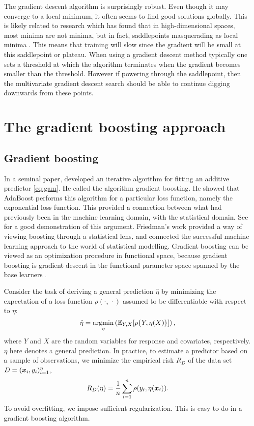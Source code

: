 The gradient descent algorithm is surprisingly robust. Even though it may converge to a local minimum, it often seems to find good solutions globally. This is likely related to research which has found that in high-dimensional spaces, most minima are not minima, but in fact, saddlepoints masquerading as local minima \citep{saddlepoints}. This means that training will slow since the gradient will be small at this saddlepoint or plateau. When using a gradient descent method typically one sets a threshold at which the algorithm terminates when the gradient becomes smaller than the threshold. However if powering through the saddlepoint, then the multivariate gradient descent search should be able to continue digging downwards from these points.

\section{The gradient boosting approach}
\subsection{Gradient boosting}
In a seminal paper, \citet{friedman2001} developed an iterative algorithm for fitting an additive predictor \eqref{eq:gam}.
He called the algorithm gradient boosting.
He showed that AdaBoost performs this algorithm for a particular loss function, namely the exponential loss function.
This provided a connection between what had previously been in the machine learning domain, with the statistical domain.
See \citet{ESL} for a good demonstration of this argument.
Friedman's work provided a way of viewing boosting through a statistical lens, and connected the successful machine learning approach to the world of statistical modelling.
Gradient boosting can be viewed as an optimization procedure in functional space, because gradient boosting is gradient descent in the functional parameter space spanned by the base learners \citep{friedman2001, buhlmann2007}.

Consider the task of deriving a general prediction $\hat{\eta}$ by minimizing the expectation of a loss function $\rho(\cdot,\,\cdot)$
assumed to be differentiable with respect to $\eta$:
\begin{equation}\label{eq:min}
    \hat{\eta}=\operatorname*{argmin}_\eta\left(\mathbb{E}_{Y,X}[\rho\{Y,\eta(X)\}]\right),
\end{equation}
where $Y$ and $X$ are the random variables for response and covariates, respectively.
$\eta$ here denotes a general prediction.
In practice, to estimate a predictor based on a sample of observations, we minimize the empirical risk $R_D$ of the data set
$D=(\bm{x}_i,y_i)_{i=1}^n$,
\begin{equation}
    R_D(\eta)=\frac{1}{n}\sum_{i=1}^n \rho(y_i,\eta(\bm{x}_i)).
\end{equation}
To avoid overfitting, we impose sufficient regularization. This is easy to do in a gradient boosting algorithm.

